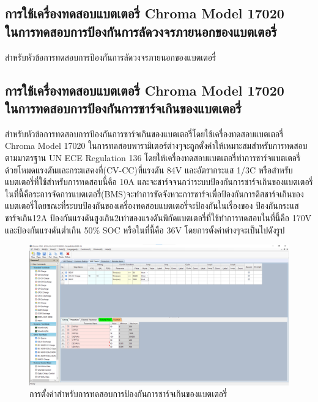 \subsection{การใช้เครื่องทดสอบแบตเตอรี่ Chroma Model 17020 \\ ในการทดสอบการป้องกันการลัดวงจรภายนอกของแบตเตอรี่}
สำหรับหัวข้อการทดสอบการป้องกันการลัดวงจรภายนอกของแบตเตอรี่
\subsection{การใช้เครื่องทดสอบแบตเตอรี่ Chroma Model 17020 \\ ในการทดสอบการป้องกันการชาร์จเกินของแบตเตอรี่}
สำหรับหัวข้อการทดสอบการป้องกันการชาร์จเกินของแบตเตอรี่โดยใช้เครื่องทดสอบแบตเตอรี่ Chroma Model 17020 ในการทดสอบพารามิเตอร์ต่างๆจะถูกตั้งค่าให้เหมาะสมสำหรับการทดสอบตามมาตรฐาน UN ECE Regulation 136 โดยให้เครื่องทดสอบแบตเตอรี่ทำการชาร์จแบตเตอรี่ด้วยโหมดแรงดันและกระแสคงที่(CV-CC)ที่แรงดัน 84V และอัตรากระแส 1/3C หรือสำหรับแบตเตอรี่ที่ใช้สำหรับการทดสอบนี้คือ 10A
และจะชาร์จจนกว่าระบบป้องกันการชาร์จเกินของแบตเตอรี่ในที่นี้คือระการจัดการแบตเตอรี่(BMS)จะทำการขัดจังหวะการชาร์จเพื่อป้องกันการดิสชาร์จเกินของแบตเตอรี่โดยขณะที่ระบบป้องกันของเครื่องทดสอบแบตเตอรี่จะป้องกันในเรื่องของ
ป้องกันกระแสชาร์จเกิน12A ป้องกันแรงดันสูงเกิน2เท่าของแรงดันพิกัดแบตเตอรี่ที่ใช้ทำการทดสอบในที่นี้คือ 170V และป้องกันแรงดันต่ำเกิน 50\% SOC หรือในที่นี้คือ 36V โดยการตั้งค่าต่างๆจะเป็นไปดังรูป
\begin{center}
	\begin{figure}[H]
		\includegraphics[width=1\linewidth]{Chapters/img/R136_DEMO/UUT_TEST_OVCP.png}
		\centering
		\captionsetup{justification=centering,margin=2cm}
		\caption{การตั้งค่าสำหรับการทดสอบการป้องกันการชาร์จเกินของแบตเตอรี่}
	\end{figure}
\end{center}
